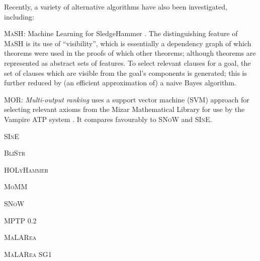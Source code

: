 Recently, a variety of alternative algorithms have also been investigated,
including:

\begin{description}
\item{\textsc{MaSH}}: Machine Learning for SledgeHammer
  \cite{kuhlwein2013mash}. The distinguishing feature of \textsc{MaSH} is its
  use of ``visibility'', which is essentially a dependency graph of which
  theorems were used in the proofs of which other theorems; although theorems
  are represented as abstract sets of features. To select relevant clauses for a
  goal, the set of clauses which are visible from the goal's components is
  generated; this is further reduced by (an efficient approximation of) a naive
  Bayes algorithm.

\item{\textsc{MOR}}: \emph{Multi-output ranking} uses a support vector machine
  (SVM) approach for selecting relevant axioms from the Mizar Mathematical
  Library for use by the Vampire ATP system \cite{alama2014premise}. \iffalse
  TODO: describe the kernel, as that's the interesting bit \fi It compares
  favourably to \textsc{SNoW} and \textsc{SInE}.

\item{\textsc{SInE}}
\item{\textsc{BliStr}}
\item{\textsc{HOLyHammer}}
\item{\textsc{MoMM}}
\item{\textsc{SNoW}}
\item{\textsc{MPTP 0.2}}
\item{\textsc{MaLARea}}
\item{\textsc{MaLARea SG1}}

\end{description}
